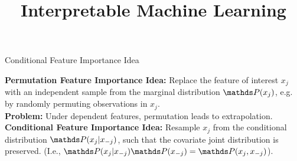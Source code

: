 \documentclass[11pt,compress,t,notes=noshow, aspectratio=169, xcolor=table]{beamer}
\title{Interpretable Machine Learning}
\date{}
\begin{document}
	\newcommand{\titlefigure}{figure_man/feature-importance.png}
    \newcommand{\learninggoals}{
    	\item Extrapolation and Conditional Sampling
    	\item Conditional Feature Importance (CFI)
    	\item Interpretation of CFI}
	
	
	
	
% 	
% 	
% 	
	
	


\begin{vbframe}{Conditional Feature Importance Idea}

\textbf{Permutation Feature Importance Idea:} Replace the feature of interest $x_j$ with an independent sample from the marginal distribution $\P(x_j)$, e.g. by randomly permuting observations in $x_j$.\\
\lz
\textbf{Problem:} Under dependent features, permutation leads to extrapolation.\\
\lz
\textbf{Conditional Feature Importance Idea:} Resample $x_j$ from the conditional distribution $\P(x_j|x_{-j})$, such that the covariate joint distribution is preserved. (I.e., $\P(x_j|x_{-j}) \P(x_{-j}) = \P(x_j, x_{-j})$).

\end{vbframe}
\end{document}
